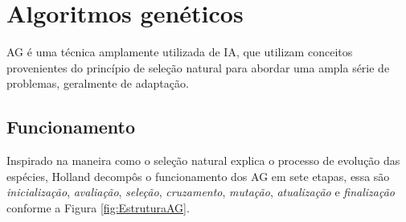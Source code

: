 \begin{minipage}{\linewidth}
	\label{fig:jung}
\end{minipage}

\section{Algoritmos genéticos}

AG é uma técnica amplamente utilizada de IA, que utilizam conceitos provenientes do princípio de seleção natural para abordar uma  ampla série de problemas, geralmente de adaptação. \cite{DiogoCLucas}

\subsection{Funcionamento}
 
Inspirado na maneira como o seleção natural explica o processo de evolução das espécies, Holland \cite{Holland1975} decompôs o funcionamento dos AG em sete etapas, essa são \textit{inicialização}, \textit{avaliação}, \textit{seleção}, \textit{cruzamento}, \textit{mutação}, \textit{atualização} e  \textit{finalização} conforme a Figura \ref{fig:EstruturaAG}. 

